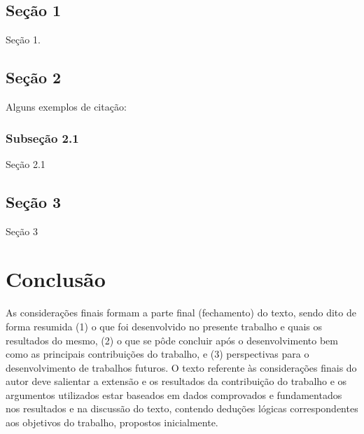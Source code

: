 \documentclass[
	12pt,				%
	openright,			%
	oneside,	
	a4paper,				%
	english,				%
	brazil				%
]{abntex2/abntex2} %
\begin{document}
	\section{Seção 1}
	
		Seção 1.
	
	\section{Seção 2}
	
		Alguns exemplos de citação:

		\subsection{Subseção 2.1}
	
			Seção 2.1
			
	\section{Seção 3}
	
		Seção 3
		
\chapter{Conclusão}

	As considerações finais formam a parte final (fechamento) do texto, sendo dito de forma resumida (1) o que foi desenvolvido no presente trabalho e quais os resultados do mesmo, (2) o que se pôde concluir após o desenvolvimento bem como as principais contribuições do trabalho, e (3) perspectivas para o desenvolvimento de trabalhos futuros. O texto referente às considerações finais do autor deve salientar a extensão e os resultados da contribuição do trabalho e os argumentos utilizados estar baseados em dados comprovados e fundamentados nos resultados e na discussão do texto, contendo deduções lógicas correspondentes aos objetivos do trabalho, propostos inicialmente.

\postextual
{}



\end{document}
